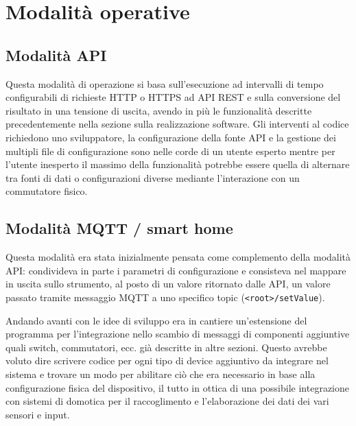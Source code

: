\documentclass[12pt,a4paper]{report}
\begin{document}


\section{Modalità operative}

\subsection{Modalità API}
Questa modalità di operazione si basa sull'esecuzione ad intervalli di tempo configurabili di richieste HTTP o HTTPS ad API REST
e sulla conversione del risultato in una tensione di uscita, avendo in più le funzionalità descritte precedentemente nella sezione
sulla realizzazione software.
Gli interventi al codice richiedono uno sviluppatore, la configurazione della fonte API e la gestione dei multipli file di configurazione sono nelle
corde di un utente esperto mentre per l'utente inesperto il massimo della funzionalità potrebbe essere quella di alternare tra fonti di dati o
configurazioni diverse mediante l'interazione con un commutatore fisico.

\subsection{Modalità MQTT / smart home}
Questa modalità era stata inizialmente pensata come complemento della modalità API: condivideva in parte i parametri di configurazione
e consisteva nel mappare in uscita sullo strumento, al posto di un valore ritornato dalle API, un valore passato tramite messaggio MQTT
a uno specifico topic (\texttt{<root>/setValue}).

Andando avanti con le idee di sviluppo era in cantiere un'estensione del programma per l'integrazione nello scambio di messaggi di componenti
aggiuntive quali switch, commutatori, ecc. già descritte in altre sezioni. Questo avrebbe voluto dire scrivere codice per ogni tipo di device
aggiuntivo da integrare nel sistema e trovare un modo per abilitare ciò che era necessario in base alla configurazione fisica del dispositivo,
il tutto in ottica di una possibile integrazione con sistemi di domotica per il raccoglimento e l'elaborazione dei dati dei vari sensori e input.
\end{document}
